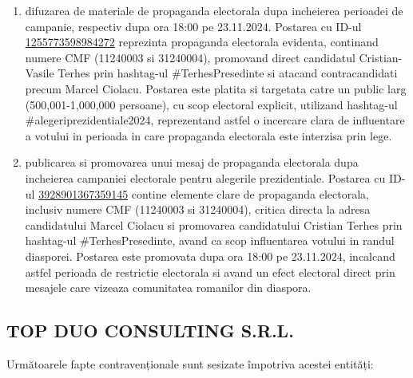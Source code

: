 \documentclass[a4paper,12pt]{article}
\begin{document}
\begin{enumerate}[leftmargin=*, label=\arabic*.)]
    \item difuzarea de materiale de propaganda electorala dupa incheierea perioadei de campanie, respectiv dupa ora 18:00 pe 23.11.2024. Postarea cu ID-ul \href{https://www.facebook.com/ads/library/?id=1255773598984272}{1255773598984272} reprezinta propaganda electorala evidenta, continand numere CMF (11240003 si 31240004), promovand direct candidatul Cristian-Vasile Terhes prin hashtag-ul \#TerhesPresedinte si atacand contracandidati precum Marcel Ciolacu. Postarea este platita si targetata catre un public larg (500,001-1,000,000 persoane), cu scop electoral explicit, utilizand hashtag-ul \#alegeriprezidentiale2024, reprezentand astfel o incercare clara de influentare a votului in perioada in care propaganda electorala este interzisa prin lege.
    \item publicarea si promovarea unui mesaj de propaganda electorala dupa incheierea campaniei electorale pentru alegerile prezidentiale. Postarea cu ID-ul \href{https://www.facebook.com/ads/library/?id=3928901367359145}{3928901367359145} contine elemente clare de propaganda electorala, inclusiv numere CMF (11240003 si 31240004), critica directa la adresa candidatului Marcel Ciolacu si promovarea candidatului Cristian Terhes prin hashtag-ul \#TerhesPresedinte, avand ca scop influentarea votului in randul diasporei. Postarea este promovata dupa ora 18:00 pe 23.11.2024, incalcand astfel perioada de restrictie electorala si avand un efect electoral direct prin mesajele care vizeaza comunitatea romanilor din diaspora.
\end{enumerate}

\vspace{0.5cm}

\subsection{TOP DUO CONSULTING S.R.L.}
Următoarele fapte contravenționale sunt sesizate împotriva acestei entități:
\end{document}
